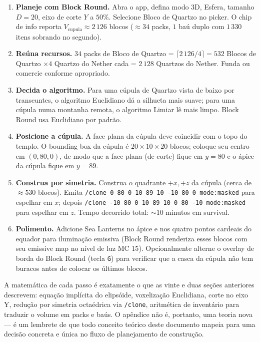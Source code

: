 \documentclass[12pt,a4paper]{scrartcl}
\newcommand{\code}[1]{\texttt{\small #1}}
\newcommand{\cmd}[1]{\textcolor{earth}{\texttt{\small #1}}}
\begin{document}
\begin{enumerate}[leftmargin=1.6em,itemsep=0.3em,topsep=0.3em]
  \item \textbf{Planeje com Block Round.} Abra o app, defina modo 3D, Esfera, tamanho $D=20$, eixo de corte $Y$ a $50\%$. Selecione Bloco de Quartzo no picker. O chip de info reporta $V_{\mathrm{cupula}} \approx 2\,126$ blocos ($\approx 34$ packs, $1$ baú duplo com $1\,330$ itens sobrando no segundo).
  \item \textbf{Reúna recursos.} $34$ packs de Bloco de Quartzo = $\lceil 2\,126/4 \rceil = 532$ Blocos de Quartzo $\times 4$ Quartzo do Nether cada = $2\,128$ Quartzos do Nether. Funda ou comercie conforme apropriado.
  \item \textbf{Decida o algoritmo.} Para uma cúpula de Quartzo vista de baixo por transeuntes, o algoritmo Euclidiano dá a silhueta mais suave; para uma cúpula numa montanha remota, o algoritmo Limiar lê mais limpo. Block Round usa Euclidiano por padrão.
  \item \textbf{Posicione a cúpula.} A face plana da cúpula deve coincidir com o topo do templo. O bounding box da cúpula é $20 \times 10 \times 20$ blocos; coloque seu centro em $(0,80,0)$, de modo que a face plana (de corte) fique em $y=80$ e o ápice da cúpula fique em $y=89$.
  \item \textbf{Construa por simetria.} Construa o quadrante $+x, +z$ da cúpula (cerca de $\approx 530$ blocos). Emita \cmd{/clone 0 80 0 10 89 10 -10 80 0 mode:masked} para espelhar em $x$; depois \cmd{/clone -10 80 0 10 89 10 0 80 -10 mode:masked} para espelhar em $z$. Tempo decorrido total: $\sim 10$ minutos em survival.
  \item \textbf{Polimento.} Adicione Sea Lanterns no ápice e nos quatro pontos cardeais do equador para iluminação emissiva (Block Round renderiza esses blocos com seu emissive map no nível de luz MC $15$). Opcionalmente alterne o overlay de borda do Block Round (tecla \code{G}) para verificar que a casca da cúpula não tem buracos antes de colocar os últimos blocos.
\end{enumerate}

A matemática de cada passo é exatamente o que as vinte e duas seções anteriores descrevem: equação implícita do elipsóide, voxelização Euclidiana, corte no eixo Y, redução por simetria octaédrica via \cmd{/clone}, aritmética de inventário para traduzir o volume em packs e baús. O apêndice não é, portanto, uma teoria nova --- é um lembrete de que todo conceito teórico deste documento mapeia para uma decisão concreta e única no fluxo de planejamento de construção.
\end{document}
